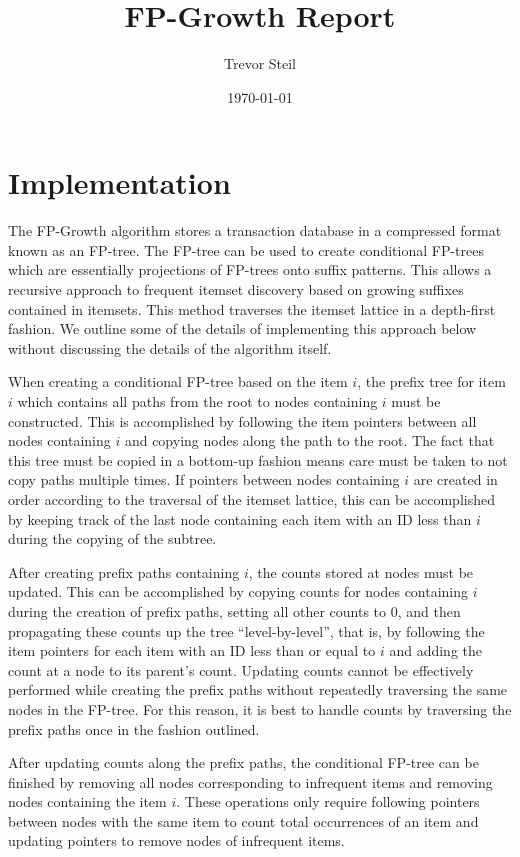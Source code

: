 \documentclass[11pt]{article}
\title{FP-Growth Report}
\date{\today}
\author{Trevor Steil}
\begin{document}
\maketitle

\section{Implementation}
The FP-Growth algorithm stores a transaction database in a compressed format known as an FP-tree. The FP-tree can be used to
create conditional FP-trees which are essentially projections of FP-trees onto suffix patterns. This allows a recursive approach to frequent itemset
discovery based on growing suffixes contained in itemsets. This method traverses the itemset lattice in a depth-first fashion. We outline some of the
details of implementing this approach below without discussing the details of the algorithm itself.

When creating a conditional FP-tree based on the item $i$, the prefix tree for item $i$ which contains all paths from the root to nodes containing $i$
must be constructed. This is accomplished by following the item pointers between all nodes containing $i$ and copying nodes along the path to the
root. The fact that this tree must be copied in a bottom-up fashion means care must be taken to not copy paths multiple times. If pointers between
nodes containing $i$ are created in order according to the traversal of the itemset lattice, this can be accomplished by keeping track of the last
node containing each item with an ID less than $i$ during the copying of the subtree.

After creating prefix paths containing $i$, the counts stored at nodes must be updated. This can be accomplished by copying counts for nodes
containing $i$ during the creation of prefix paths, setting all other counts to 0, and then propagating these counts up the tree ``level-by-level'', that is, by following the item
pointers for each item with an ID less than or equal to $i$ and adding the count at a node to its parent's count. Updating counts cannot be
effectively performed while creating the prefix paths without repeatedly traversing the same nodes in the FP-tree. For this reason, it is best to
handle counts by traversing the prefix paths once in the fashion outlined.

After updating counts along the prefix paths, the conditional FP-tree can be finished by removing all nodes corresponding to infrequent items and
removing nodes containing the item $i$. These operations only require following pointers between nodes with the same item to count total occurrences
of an item and updating pointers to remove nodes of infrequent items.
\end{document}
